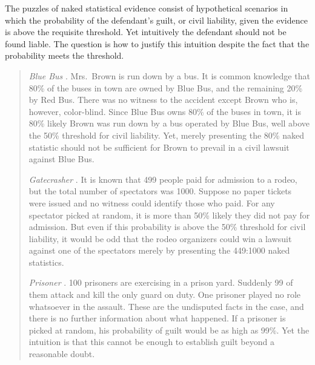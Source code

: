 \documentclass{article}
\begin{document}
The puzzles of naked statistical evidence consist 
of hypothetical scenarios in which the probability of the defendant's 
guilt, or civil liability, given the evidence is above the requisite threshold. 
Yet intuitively the defendant should not be found liable.
The question is how to justify this intuition despite the fact that the probability meets the threshold. 
%
\begin{quote}
\textit{Blue Bus} \citep{tribe71}. Mrs.\ Brown is run down by a bus. It is common knowledge that 80\% of the buses in town are owned by Blue Bus, and the remaining 20\% by Red Bus. There was no witness to the accident except Brown who is, however, color-blind. Since Blue Bus owns 80\% of the buses in town, it is 80\% likely Brown was run down by a bus operated by Blue Bus, well above the 50\% threshold for civil liability.  Yet, merely presenting the 80\% naked statistic should not be sufficient for Brown to prevail in a civil lawsuit against Blue Bus. 


\textit{Gatecrasher} \citep{Cohen1977The-probable-an}. It is known that 499 people paid for
admission to a rodeo, but the total number of spectators was 1000. Suppose no paper tickets were issued and 
no witness could identify 
those who paid.  For any spectator picked at random, it is more than 50\% likely they did not pay for admission. But even if this probability is above the 50\% threshold for civil liability, it would be odd that the rodeo organizers could win a lawsuit against one of the spectators merely by presenting the 449:1000 naked statistics. 


\textit{Prisoner} \citep{Nesson1979Reasonable-doub}. 100 prisoners are exercising in a prison yard. Suddenly 99 of them attack and kill the only guard on duty. One prisoner played no role whatsoever in the assault. These are the undisputed facts in the case, and there is no further information about what happened. If a prisoner is picked at random, his probability of guilt would be as high as 99\%.  Yet the intuition is that this cannot be enough to establish guilt beyond a reasonable doubt. 
\end{quote}
\end{document}
